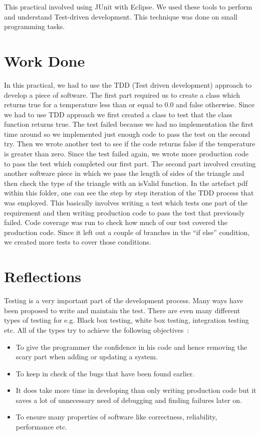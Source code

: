 This practical involved using JUnit with Eclipse. We used these tools to perform and understand Test-driven development. This technique was done on small programming tasks.

\section{Work Done}

In this practical, we had to use the TDD (Test driven development) approach to develop a piece of software. The first part required us to create a class which returns true for a temperature less than or equal to 0.0 and false otherwise. Since we had to use TDD approach we first created a class to test that the class function returns true. The test failed because we had no implementation the first time around so we implemented just enough code to pass the test on the second try. Then we wrote another test to see if the code returns false if the temperature is greater than zero. Since the test failed again, we wrote more production code to pass the test which completed our first part. The second part involved creating another software piece in which we pass the length of sides of the triangle and then check the type of the triangle with an isValid function. In the artefact pdf within this folder, one can see the step by step iteration of the TDD process that was employed. This basically involves writing a test which tests one part of the requirement and then writing production code to pass the test that previously failed. Code coverage was run to check how much of our test covered the production code. Since it left out a couple of branches in the ``if else'' condition, we created more tests to cover those conditions.

\section{Reflections}

Testing is a very important part of the development process. Many ways have been proposed to write and maintain the test. There are even many different types of testing for e.g. Black box testing, white box testing, integration testing etc. All of the types try to achieve the following objectives~\cite{myers2011art}:

\begin{itemize}
    \item To give the programmer the confidence in his code and hence removing the scary part when adding or updating a system.
    \item To keep in check of the bugs that have been found earlier.
    \item It does take more time in developing than only writing production code but it saves a lot of unnecessary need of debugging and finding failures later on.
    \item To ensure many properties of software like correctness, reliability, performance etc.
\end{itemize}

